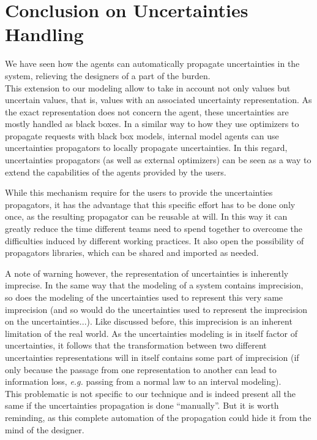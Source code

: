 \section{Conclusion on Uncertainties Handling}

We have seen how the agents can automatically propagate uncertainties in the system, relieving the designers of a part of the burden.\\
This extension to our modeling allow to take in account not only values but uncertain values, that is, values with an associated uncertainty representation. As the exact representation does not concern the agent, these uncertainties are mostly handled as black boxes. In a similar way to how they use optimizers to propagate requests with black box models, internal model agents can use uncertainties propagators to locally propagate uncertainties. In this regard, uncertainties propagators (as well as external optimizers) can be seen as a way to extend the capabilities of the agents provided by the users.

While this mechanism require for the users to provide the uncertainties propagators, it has the advantage that this specific effort has to be done only once, as the resulting propagator can be reusable at will. In this way it can greatly reduce the time different teams need to spend together to overcome the difficulties induced by different working practices. It also open the possibility of propagators libraries, which can be shared and imported as needed.

A note of warning however, the representation of uncertainties is inherently imprecise. In the same way that the modeling of a system contains imprecision, so does the modeling of the uncertainties used to represent this very same imprecision (and so would do the uncertainties used to represent the imprecision on the uncertainties...). Like discussed before, this imprecision is an inherent limitation of the real world. As the uncertainties modeling is in itself factor of uncertainties, it follows that the transformation between two different uncertainties representations will in itself contains some part of imprecision (if only because the passage from one representation to another can lead to information loss, \emph{e.g.} passing from a normal law to an interval modeling).\\
This problematic is not specific to our technique and is indeed present all the same if the uncertainties propagation is done \enquote{manually}. But it is worth reminding, as this complete automation of the propagation could hide it from the mind of the designer.

